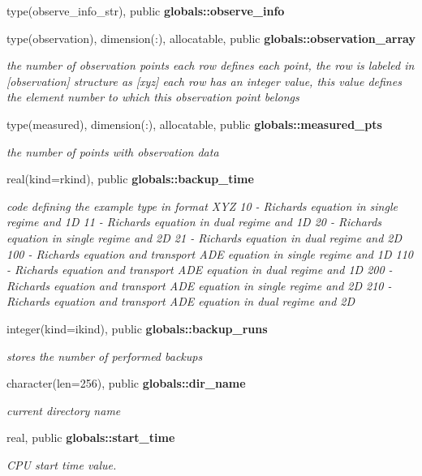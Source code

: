 \begin{DoxyCompactItemize}
type(observe\+\_\+info\+\_\+str), public {\bf globals\+::observe\+\_\+info}
\item 
type(observation), dimension(\+:), allocatable, public {\bf globals\+::observation\+\_\+array}
\begin{DoxyCompactList}\small\item\em the number of observation points each row defines each point, the row is labeled in [observation] structure as [xyz] each row has an integer value, this value defines the element number to which this observation point belongs \end{DoxyCompactList}\item 
type(measured), dimension(\+:), allocatable, public {\bf globals\+::measured\+\_\+pts}
\begin{DoxyCompactList}\small\item\em the number of points with observation data \end{DoxyCompactList}\item 
real(kind=rkind), public {\bf globals\+::backup\+\_\+time}
\begin{DoxyCompactList}\small\item\em code defining the example type in format X\+YZ 10 -\/ Richards equation in single regime and 1D 11 -\/ Richards equation in dual regime and 1D 20 -\/ Richards equation in single regime and 2D 21 -\/ Richards equation in dual regime and 2D 100 -\/ Richards equation and transport A\+DE equation in single regime and 1D 110 -\/ Richards equation and transport A\+DE equation in dual regime and 1D 200 -\/ Richards equation and transport A\+DE equation in single regime and 2D 210 -\/ Richards equation and transport A\+DE equation in dual regime and 2D \end{DoxyCompactList}\item 
integer(kind=ikind), public {\bf globals\+::backup\+\_\+runs}
\begin{DoxyCompactList}\small\item\em stores the number of performed backups \end{DoxyCompactList}\item 
character(len=256), public {\bf globals\+::dir\+\_\+name}
\begin{DoxyCompactList}\small\item\em current directory name \end{DoxyCompactList}\item 
real, public {\bf globals\+::start\+\_\+time}
\begin{DoxyCompactList}\small\item\em C\+PU start time value. \end{DoxyCompactList}\item 

\end{DoxyCompactItemize}
